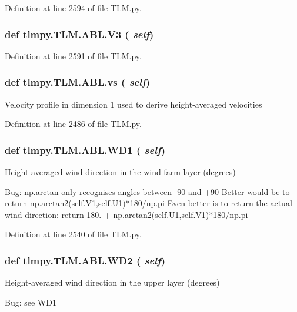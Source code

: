 Definition at line 2594 of file TLM.py.\hypertarget{classtlmpy_1_1TLM_1_1ABL_a471433ca280fe46bffa9320a2777c582}{
\subsubsection[{V3}]{\setlength{\rightskip}{0pt plus 5cm}def tlmpy.TLM.ABL.V3 ( {\em self})}}
\label{classtlmpy_1_1TLM_1_1ABL_a471433ca280fe46bffa9320a2777c582}


Definition at line 2591 of file TLM.py.\hypertarget{classtlmpy_1_1TLM_1_1ABL_aa6fbc3d7b3cdc4e12333bd3758929db6}{
\subsubsection[{vs}]{\setlength{\rightskip}{0pt plus 5cm}def tlmpy.TLM.ABL.vs ( {\em self})}}
\label{classtlmpy_1_1TLM_1_1ABL_aa6fbc3d7b3cdc4e12333bd3758929db6}
\begin{DoxyVerb}Velocity profile in dimension 1 used to derive
height-averaged velocities\end{DoxyVerb}
 

Definition at line 2486 of file TLM.py.\hypertarget{classtlmpy_1_1TLM_1_1ABL_a03d527782c043d5cab6de178a6c6d0b0}{
\subsubsection[{WD1}]{\setlength{\rightskip}{0pt plus 5cm}def tlmpy.TLM.ABL.WD1 ( {\em self})}}
\label{classtlmpy_1_1TLM_1_1ABL_a03d527782c043d5cab6de178a6c6d0b0}
\begin{DoxyVerb}
Height-averaged wind direction in the wind-farm layer (degrees)

Bug: np.arctan only recognises angles between -90 and +90
Better would be to return np.arctan2(self.V1,self.U1)*180/np.pi
Even better is to return the actual wind direction:
    return 180. + np.arctan2(self.U1,self.V1)*180/np.pi
\end{DoxyVerb}
 

Definition at line 2540 of file TLM.py.\hypertarget{classtlmpy_1_1TLM_1_1ABL_a7fcfd78fee40637c672e60a13842ae57}{
\subsubsection[{WD2}]{\setlength{\rightskip}{0pt plus 5cm}def tlmpy.TLM.ABL.WD2 ( {\em self})}}
\label{classtlmpy_1_1TLM_1_1ABL_a7fcfd78fee40637c672e60a13842ae57}
\begin{DoxyVerb}
Height-averaged wind direction in the upper layer (degrees)

Bug: see WD1
\end{DoxyVerb}
 

